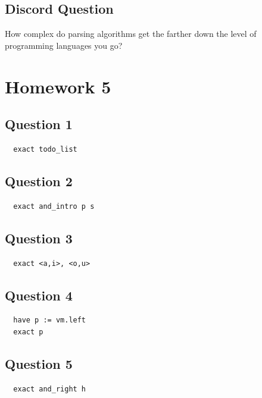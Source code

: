 \documentclass{article}
\theoremstyle{plain}
\theoremstyle{definition}
\theoremstyle{remark}
\begin{document}
\subsection{Discord Question}

How complex do parsing algorithms get the farther down the level of programming languages you go?


\section{Homework 5}\label{homework5}

\subsection{Question 1}

\begin{lstlisting}
  exact todo_list
\end{lstlisting}

\subsection{Question 2}

\begin{lstlisting}
  exact and_intro p s
\end{lstlisting}

\subsection{Question 3}

\begin{lstlisting}
  exact <a,i>, <o,u>
\end{lstlisting}

\subsection{Question 4}

\begin{lstlisting}
  have p := vm.left
  exact p
\end{lstlisting}

\subsection{Question 5}

\begin{lstlisting}
  exact and_right h
\end{lstlisting}
\end{document}
